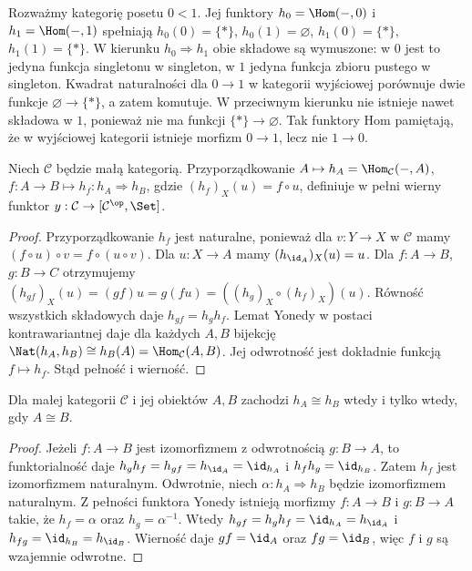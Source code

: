\begin{przyklad}
Rozważmy kategorię posetu $0<1$. Jej funktory $h_0=\Hom(-,0)$ i $h_1=\Hom(-,1)$ spełniają
$h_0(0)=\{*\}$, $h_0(1)=\varnothing$, $h_1(0)=\{*\}$, $h_1(1)=\{*\}$. W kierunku $h_0\Rightarrow h_1$ obie składowe są wymuszone: w $0$ jest to jedyna funkcja singletonu w singleton, w $1$ jedyna funkcja zbioru pustego w singleton. Kwadrat naturalności dla $0\to1$ w kategorii wyjściowej porównuje dwie funkcje $\varnothing\to\{*\}$, a zatem komutuje. W przeciwnym kierunku nie istnieje nawet składowa w $1$, ponieważ nie ma funkcji $\{*\}\to\varnothing$. Tak funktory Hom pamiętają, że w wyjściowej kategorii istnieje morfizm $0\to1$, lecz nie $1\to0$.
\end{przyklad}


\begin{twierdzenie}\label{tw:yoneda-embedding}
Niech $\mathcal C$ będzie małą kategorią. Przyporządkowanie $A\mapsto h_A=\Hom_{\mathcal C}(-,A)$, $f:A\to B\mapsto h_f:h_A\Rightarrow h_B$, gdzie $(h_f)_X(u)=f\circ u$, definiuje w pełni wierny funktor $y:\mathcal C\to[\mathcal C^{\op},\Set]$.
\end{twierdzenie}
\begin{proof}
Przyporządkowanie $h_f$ jest naturalne, ponieważ dla $v:Y\to X$ w $\mathcal C$ mamy $(f\circ u)\circ v=f\circ(u\circ v)$. Dla $u:X\to A$ mamy $(h_{\id_A})_X(u)=u$. Dla $f:A\to B$, $g:B\to C$ otrzymujemy $(h_{gf})_X(u)=(gf)u=g(fu)=((h_g)_X\circ(h_f)_X)(u)$. Równość wszystkich składowych daje $h_{gf}=h_gh_f$. Lemat Yonedy w postaci kontrawariantnej daje dla każdych $A,B$ bijekcję $\Nat(h_A,h_B)\cong h_B(A)=\Hom_{\mathcal C}(A,B)$. Jej odwrotność jest dokładnie funkcją $f\mapsto h_f$. Stąd pełność i wierność.
\end{proof}

\begin{wniosek}
Dla małej kategorii $\mathcal C$ i jej obiektów $A,B$ zachodzi $h_A\cong h_B$ wtedy i tylko wtedy, gdy $A\cong B$.
\end{wniosek}
\begin{proof}
Jeżeli $f:A\to B$ jest izomorfizmem z odwrotnością $g:B\to A$, to funktorialność daje $h_gh_f=h_{gf}=h_{\id_A}=\id_{h_A}$ i $h_fh_g=\id_{h_B}$. Zatem $h_f$ jest izomorfizmem naturalnym. Odwrotnie, niech $\alpha:h_A\Rightarrow h_B$ będzie izomorfizmem naturalnym. Z pełności funktora Yonedy istnieją morfizmy $f:A\to B$ i $g:B\to A$ takie, że $h_f=\alpha$ oraz $h_g=\alpha^{-1}$. Wtedy $h_{gf}=h_gh_f=\id_{h_A}=h_{\id_A}$ i $h_{fg}=\id_{h_B}=h_{\id_B}$. Wierność daje $gf=\id_A$ oraz $fg=\id_B$, więc $f$ i $g$ są wzajemnie odwrotne.
\end{proof}

